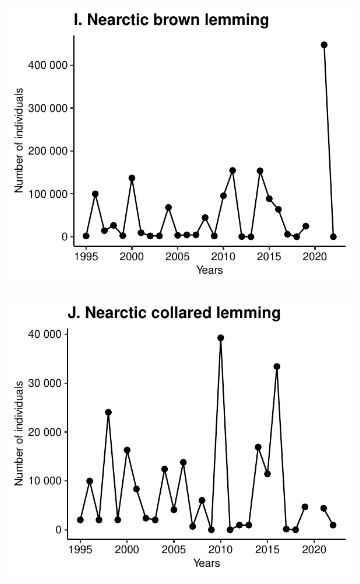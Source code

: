 \documentclass[a4paper,twoside,12pt]{article}
\begin{document}
\begin{figure}[h]
  \centering
  \begin{subfigure}{0.45\textwidth}
    \includegraphics[width=\linewidth]{figures/species_temporal_series/Nearctic_brown_lemming.pdf}
  \end{subfigure}
  \begin{subfigure}{0.45\textwidth}
    \includegraphics[width=\linewidth]{figures/species_temporal_series/Nearctic_collared_lemming.pdf}
  \end{subfigure} 
    \hfill
    \hfill
  \begin{subfigure}{0.45\textwidth}

\end{subfigure}
\end{figure}
\end{document}
